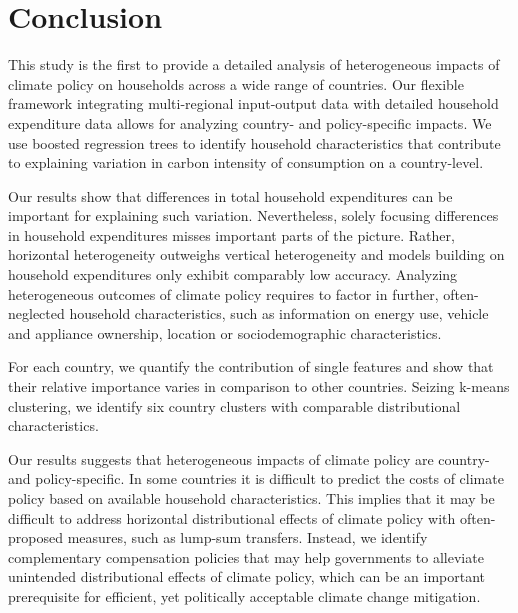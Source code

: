 \documentclass[12pt, a4paper]{article}
\begin{document}
\section{Conclusion} \label{sec:conclusion}

This study is the first to provide a detailed analysis of heterogeneous impacts of climate policy on households across a wide range of countries. Our flexible framework integrating multi-regional input-output data with detailed household expenditure data allows for analyzing country- and policy-specific impacts. We use boosted regression trees to identify household characteristics that contribute to explaining variation in carbon intensity of consumption on a country-level.

Our results show that differences in total household expenditures can be important for explaining such variation. Nevertheless, solely focusing differences in household expenditures misses important parts of the picture. Rather, horizontal heterogeneity outweighs vertical heterogeneity and models building on household expenditures only exhibit comparably low accuracy. Analyzing heterogeneous outcomes of climate policy requires to factor in further, often-neglected household characteristics, such as information on energy use, vehicle and appliance ownership, location or sociodemographic characteristics.

For each country, we quantify the contribution of single features and show that their relative importance varies in comparison to other countries. Seizing k-means clustering, we identify six country clusters with comparable distributional characteristics. %

Our results suggests that heterogeneous impacts of climate policy are country- and policy-specific. In some countries it is difficult to predict the costs of climate policy based on available household characteristics. This implies that it may be difficult to address horizontal distributional effects of climate policy with often-proposed measures, such as lump-sum transfers. Instead, we identify complementary compensation policies that may help governments to alleviate unintended distributional effects of climate policy, which can be an important prerequisite for efficient, yet politically acceptable climate change mitigation. 
\end{document}
